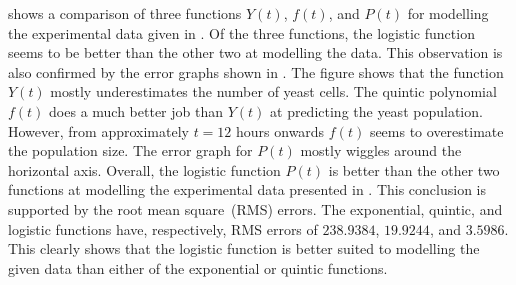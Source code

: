\documentclass[a4paper,oneside,12pt]{article}
\begin{document}
\begin{problem}
{\begin{solution}
 shows a comparison of three
functions $Y(t)$, $f(t)$, and $P(t)$ for modelling the experimental
data given in .  Of the three functions, the logistic
function seems to be better than the other two at modelling the data.
This observation is also confirmed by the error graphs shown in
.  The figure shows that the function
$Y(t)$ mostly underestimates the number of yeast cells.  The quintic
polynomial $f(t)$ does a much better job than $Y(t)$ at predicting the
yeast population.  However, from approximately $t = 12$ hours onwards
$f(t)$ seems to overestimate the population size.  The error graph for
$P(t)$ mostly wiggles around the horizontal axis.  Overall, the
logistic function $P(t)$ is better than the other two functions at
modelling the experimental data presented in .  This
conclusion is supported by the root mean square~(RMS) errors.  The
exponential, quintic, and logistic functions have, respectively, RMS
errors of $238.9384$, $19.9244$, and $3.5986$.  This clearly shows
that the logistic function is better suited to modelling the given
data than either of the exponential or quintic functions.
\end{solution}
}{}
\end{problem}
\end{document}
